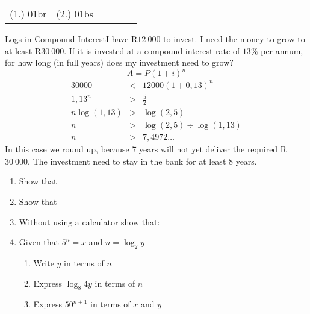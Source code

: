 {{%
\par \practiceinfo
\par \begin{tabular}[h]{cccccc}
(1.)	01br	&
(2.)	01bs	&
\end{tabular}

\begin{wex}{Logs in Compound Interest}{I have R$12~000$ to invest.  I need the money to grow to at least R$30~000$.  If it is invested at a compound interest rate of $13\%$ per annum, for how long (in full years) does my investment need to grow? }{
\begin{equation*}
A=P(1+i)^n 
\end{equation*}
\begin{eqnarray*}
30000 &<& 12000(1+0,13)^n\\
1,13^n &>& \frac{5}{2}\\
n\log(1,13) &>& \log(2,5)\\
n &>& \log(2,5) \div \log(1,13)\\
n &>& 7,4972\ldots
\end{eqnarray*}
In this case we round up, because 7 years will not yet deliver the required R$30~000$.
The investment need to stay in the bank for at least 8 years.}\end{wex}

\begin{eocexercises}{}
\begin{enumerate}
\item{Show that
}
\item{Show that
}
\item{Without using a calculator show that:
}
\item{Given that $5^n=x$ and $n=\log_2y$
\begin{enumerate}
\item Write $y$ in terms of $n$
\item Express $\log_8 4y$ in terms of $n$
\item Express $50^{n+1}$ in terms of $x$ and $y$
\end{enumerate}}


\end{enumerate}
\end{eocexercises}}}
